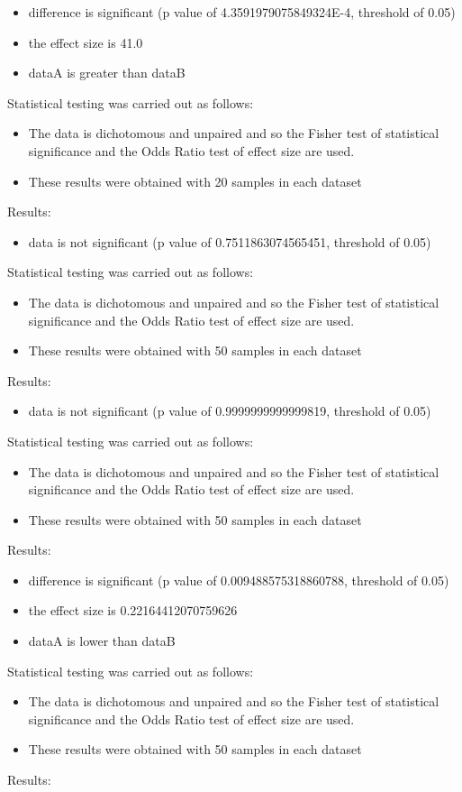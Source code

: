 \documentclass[]{article}
\begin{document}
\begin{itemize}
\item{difference is significant (p value of 4.3591979075849324E-4, threshold of 0.05)}
\item{the effect size is 41.0}
\item{dataA is greater than dataB}
\end{itemize}Statistical testing was carried out as follows: \begin{itemize}
\item{The data is dichotomous and unpaired and so the Fisher test of statistical significance and the Odds Ratio test of effect size are used.}
\item{These results were obtained with 20 samples in each dataset}
\end{itemize}Results:
\begin{itemize}
\item{data is not significant (p value of 0.7511863074565451, threshold of 0.05)}
\end{itemize}Statistical testing was carried out as follows: \begin{itemize}
\item{The data is dichotomous and unpaired and so the Fisher test of statistical significance and the Odds Ratio test of effect size are used.}
\item{These results were obtained with 50 samples in each dataset}
\end{itemize}Results:
\begin{itemize}
\item{data is not significant (p value of 0.9999999999999819, threshold of 0.05)}
\end{itemize}Statistical testing was carried out as follows: \begin{itemize}
\item{The data is dichotomous and unpaired and so the Fisher test of statistical significance and the Odds Ratio test of effect size are used.}
\item{These results were obtained with 50 samples in each dataset}
\end{itemize}Results:
\begin{itemize}
\item{difference is significant (p value of 0.009488575318860788, threshold of 0.05)}
\item{the effect size is 0.22164412070759626}
\item{dataA is lower than dataB}
\end{itemize}Statistical testing was carried out as follows: \begin{itemize}
\item{The data is dichotomous and unpaired and so the Fisher test of statistical significance and the Odds Ratio test of effect size are used.}
\item{These results were obtained with 50 samples in each dataset}
\end{itemize}Results:
\end{document}
